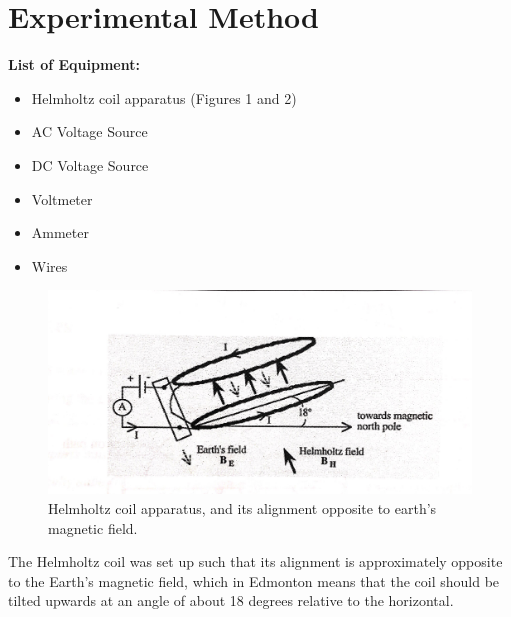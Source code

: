 \documentclass[letterpaper]{article}
\begin{document}
\section{Experimental Method}

\textbf{List of Equipment:}
\begin{itemize}
  \item Helmholtz coil apparatus (Figures 1 and 2)
  \item AC Voltage Source
  \item DC Voltage Source
  \item Voltmeter
  \item Ammeter
  \item Wires
\end{itemize}

\begin{figure}[h!]
    \centering
    \includegraphics[width=\textwidth]{fig1.jpg}
    \caption{Helmholtz coil apparatus, and its alignment opposite to earth's magnetic field. \cite{labmanual}}
\end{figure}

The Helmholtz coil was set up such that its alignment is approximately
opposite to the Earth's magnetic field, which in Edmonton means that the coil
should be tilted upwards at an angle of about 18 degrees relative to the horizontal.
\end{document}
